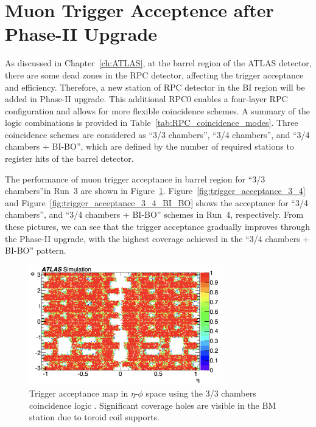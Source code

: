 \section{Muon Trigger Acceptence after Phase-II Upgrade} \label{sec:MuonTriggerAcceptance}
As discussed in Chapter~\ref{ch:ATLAS}, at the barrel region of the ATLAS detector, there are some dead zones in the RPC detector, affecting the trigger acceptance and efficiency. Therefore, a new station of RPC detector in the BI region will be added in Phase-II upgrade. This additional RPC0 enables a four-layer RPC configuration and allows for more flexible coincidence schemes. A summary of the logic combinations is provided in Table~\ref{tab:RPC_coincidence_modes}. Three coincidence schemes are considered as ``3/3 chambers'', ``3/4 chambers'', and ``3/4 chambers + BI-BO'', which are defined by the number of required stations to register hits of the barrel detector. 

The performance of muon trigger acceptance in barrel region for ``3/3 chambers''in Run~3  are shown in Figure~\ref{fig:trigger_acceptance_3_3}. Figure~\ref{fig:trigger_acceptance_3_4} and Figure~\ref{fig:trigger_acceptance_3_4_BI_BO} shows the acceptance for ``3/4 chambers'', and ``3/4 chambers + BI-BO'' schemes in Run~4, respectively. From these pictures, we can see that the trigger acceptance gradually improves through the Phase-II upgrade, with the highest coverage achieved in the “3/4 chambers + BI-BO” pattern.



\begin{figure}[htbp]
  \centering
  \includegraphics[width=0.75\textwidth]{figs/chapter4/trigger_acceptance_map_3_3.png}
  \caption{Trigger acceptance map in $\eta$-$\phi$ space using the 3/3 chambers coincidence logic \cite{TDAQ_TDR}. Significant coverage holes are visible in the BM station due to toroid coil supports.}
  \label{fig:trigger_acceptance_3_3}
\end{figure}

